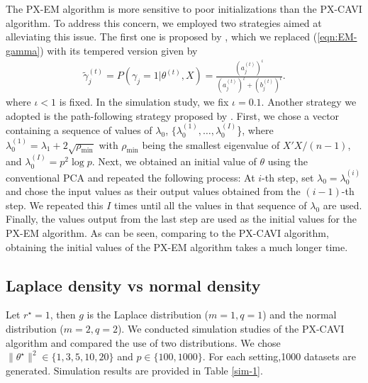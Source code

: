 \documentclass[pdftex, noinfoline, letter]{imsart}
\theoremstyle{plain}
\begin{document}
The PX-EM algorithm is more sensitive to poor initializations than the PX-CAVI algorithm. To address this concern, we employed two strategies aimed at alleviating this issue. The first one is proposed by \citet{rockova14}, which we replaced (\ref{eqn:EM-gamma}) with its tempered version given by 
\begin{align}
\label{eqn:termpered-gamma}
\widetilde \gamma_j^{(t)} = P(\gamma_j=1|\theta^{(t)}, X) = \frac{\left(a_j^{(t)}\right)^\iota}{\left(a_j^{(t)}\right)^\iota
+ \left(b_j^{(t)}\right)^\iota}.
\end{align}
where $\iota < 1$ is fixed. 
In the simulation study, we fix $\iota = 0.1$.
Another strategy we adopted is the path-following strategy proposed by \citet{rockova16}. First, we chose a vector containing a sequence of values of $\lambda_0$, $\{\lambda_0^{(1)}, \dots, \lambda_0^{(I)}$\}, where $\lambda_0^{(1)} = \lambda_1 + 2\sqrt{\rho_{\min}}$ with $\rho_{\min}$ being the smallest eigenvalue of $X'X/(n-1)$, and $\lambda_0^{(I)} = p^2\log p$. Next, we obtained an initial value of $\theta$ using the conventional PCA and repeated the following process: At $i$-th step, set $\lambda_0 = \lambda_0^{(i)}$ and chose the input values as their output values obtained from the $(i-1)$-th step. We repeated this $I$ times until all the values in that sequence of $\lambda_0$ are used. Finally, the values output from the last step are used as the initial values for the PX-EM algorithm. As can be seen, comparing to the PX-CAVI algorithm, obtaining the initial values of the PX-EM algorithm takes a much longer time. 

\subsection{Laplace density vs normal density}
\label{sec:sim-1}

Let $r^\star =1$, then $g$ is the Laplace distribution ($m =1, q = 1$) and the normal distribution ($m = 2, q = 2$). We conducted  simulation studies of the PX-CAVI algorithm and compared the use of two distributions. We chose $\|\theta^\star\|^2 \in \{1, 3, 5, 10, 20\}$ and $p \in \{100, 1000\}$. For each setting,1000 datasets are generated. 
Simulation results are provided in Table \ref{sim-1}.
\end{document}
